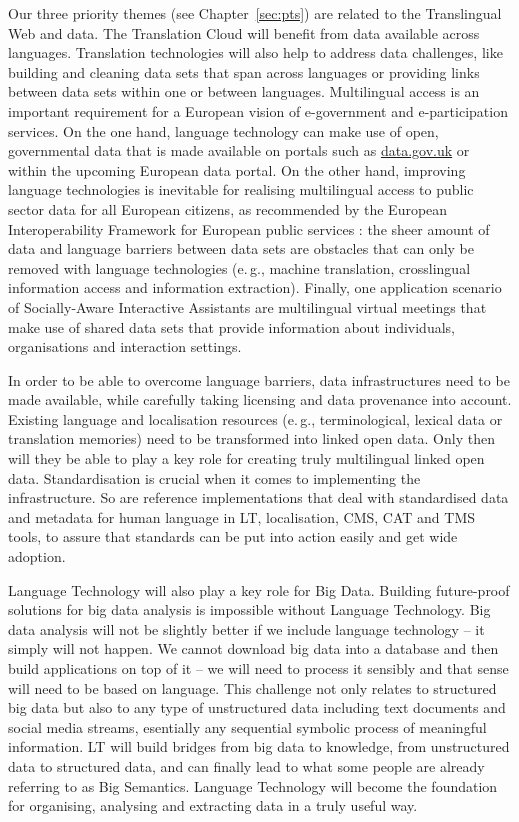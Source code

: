 \documentclass[10pt, plain]{../../metanetpaper}
\begin{document}
\begin{multicols}{2}
Our three priority themes (see Chapter~\ref{sec:pts}) are related to the Translingual Web and data. The Translation Cloud will benefit from data available across languages. Translation technologies will also help to address data challenges, like building and cleaning data sets that span across languages or providing links between data sets within one or between languages. Multilingual access is an important requirement for a European vision of e-government and e-participation services. On the one hand, language technology can make use of open, governmental data that is made available on portals such as \url{data.gov.uk} or within the upcoming European data portal. On the other hand, improving language technologies is inevitable for realising multilingual access to public sector data for all European citizens, as recommended by the European Interoperability Framework for European public services \cite{EIF2010}: the sheer amount of data and language barriers between data sets are obstacles that can only be removed with language technologies (e.\,g., machine translation, crosslingual information access and information extraction). Finally, one application scenario of Socially-Aware Interactive Assistants are multilingual virtual meetings that make use of shared data sets that provide information about individuals, organisations and interaction settings. 
 
In order to be able to overcome language barriers, data infrastructures need to be made available, while carefully taking licensing and data provenance into account. Existing language and localisation resources (e.\,g., terminological, lexical data or translation memories) need to be transformed into linked open data. Only then will they be able to play a key role for creating truly multilingual linked open data.  Standardisation is crucial when it comes to implementing the infrastructure. So are reference implementations that deal with standardised data and metadata for human language in LT, localisation, CMS, CAT and TMS tools, to assure that standards can be put into action easily and get wide adoption.

Language Technology will also play a key role for Big Data. Building future-proof solutions for big data analysis is impossible without Language Technology. Big data analysis will not be slightly better if we include language technology -- it simply will not happen. We cannot download big data into a database and then build applications on top of it -- we will need to process it sensibly and that sense will need to be based on language. This challenge not only relates to structured big data but also to any type of unstructured data including text documents and social media streams, esentially any sequential symbolic process of meaningful information. LT will build bridges from big data to knowledge, from unstructured data to structured data, and can finally lead to what some people are already referring to as Big Semantics. Language Technology will become the foundation for organising, analysing and extracting data in a truly useful way.


\end{multicols}
\end{document}
